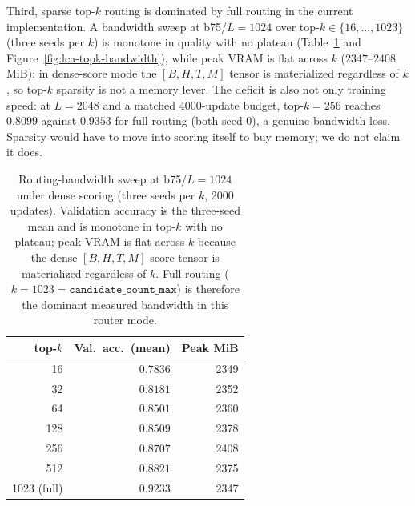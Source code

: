 \documentclass{article}
\theoremstyle{plain}
\theoremstyle{definition}
\theoremstyle{remark}
\begin{document}
Third, sparse top-$k$ routing is dominated by full routing in the current
implementation.  A bandwidth sweep at b75/$L=1024$ over
top-$k\in\{16,\ldots,1023\}$ (three seeds per $k$) is monotone in quality with
no plateau (Table~\ref{tab:lca-topk-bandwidth} and
Figure~\ref{fig:lca-topk-bandwidth}), while peak VRAM is flat
across $k$ ($2347$--$2408$ MiB): in dense-score mode the $[B,H,T,M]$ tensor is
materialized regardless of $k$, so top-$k$ sparsity is not a memory lever.
The deficit is also not only training speed: at $L=2048$ and a matched
4000-update budget, top-$k{=}256$ reaches $0.8099$ against $0.9353$ for full
routing (both seed 0), a genuine bandwidth loss.  Sparsity would have to move
into scoring itself to buy memory; we do not claim it does.

\begin{table}[t]
\centering
\caption{Routing-bandwidth sweep at b75/$L=1024$ under dense scoring (three
seeds per $k$, 2000 updates).  Validation accuracy is the three-seed mean and
is monotone in top-$k$ with no plateau; peak VRAM is flat across $k$ because
the dense $[B,H,T,M]$ score tensor is materialized regardless of $k$.  Full
routing ($k{=}1023=\texttt{candidate\_count\_max}$) is therefore the dominant
measured bandwidth in this router mode.}
\label{tab:lca-topk-bandwidth}
\begin{tabular}{rrr}
\toprule
top-$k$ & Val.\ acc.\ (mean) & Peak MiB \\
\midrule
16 & $0.7836$ & 2349 \\
32 & $0.8181$ & 2352 \\
64 & $0.8501$ & 2360 \\
128 & $0.8509$ & 2378 \\
256 & $0.8707$ & 2408 \\
512 & $0.8821$ & 2375 \\
1023 (full) & $0.9233$ & 2347 \\
\bottomrule
\end{tabular}
\end{table}
\end{document}

